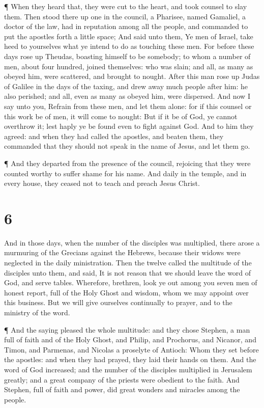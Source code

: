  ¶ When they heard that, they were cut to the heart, and
took counsel to slay them.  Then stood there up one in the
council, a Pharisee, named Gamaliel, a doctor of the law, had in
reputation among all the people, and commanded to put the apostles forth
a little space;  And said unto them, Ye men of Israel, take
heed to yourselves what ye intend to do as touching these men.
 For before these days rose up Theudas, boasting himself to
be somebody; to whom a number of men, about four hundred, joined
themselves: who was slain; and all, as many as obeyed him, were
scattered, and brought to nought.  After this man rose up
Judas of Galilee in the days of the taxing, and drew away much people
after him: he also perished; and all, even as many as obeyed him, were
dispersed.  And now I say unto you, Refrain from these men,
and let them alone: for if this counsel or this work be of men, it will
come to nought:  But if it be of God, ye cannot overthrow
it; lest haply ye be found even to fight against God.  And
to him they agreed: and when they had called the apostles, and beaten
them, they commanded that they should not speak in the name of Jesus,
and let them go.

 ¶ And they departed from the presence of the council,
rejoicing that they were counted worthy to suffer shame for his name.
 And daily in the temple, and in every house, they ceased
not to teach and preach Jesus Christ.

\hypertarget{section-5}{%
\section{6}\label{section-5}}

 And in those days, when the number of the disciples was
multiplied, there arose a murmuring of the Grecians against the Hebrews,
because their widows were neglected in the daily ministration.
 Then the twelve called the multitude of the disciples unto
them, and said, It is not reason that we should leave the word of God,
and serve tables.  Wherefore, brethren, look ye out among
you seven men of honest report, full of the Holy Ghost and wisdom, whom
we may appoint over this business.  But we will give
ourselves continually to prayer, and to the ministry of the word.

 ¶ And the saying pleased the whole multitude: and they
chose Stephen, a man full of faith and of the Holy Ghost, and Philip,
and Prochorus, and Nicanor, and Timon, and Parmenas, and Nicolas a
proselyte of Antioch:  Whom they set before the apostles:
and when they had prayed, they laid their hands on them. 
And the word of God increased; and the number of the disciples
multiplied in Jerusalem greatly; and a great company of the priests were
obedient to the faith.  And Stephen, full of faith and
power, did great wonders and miracles among the people.

